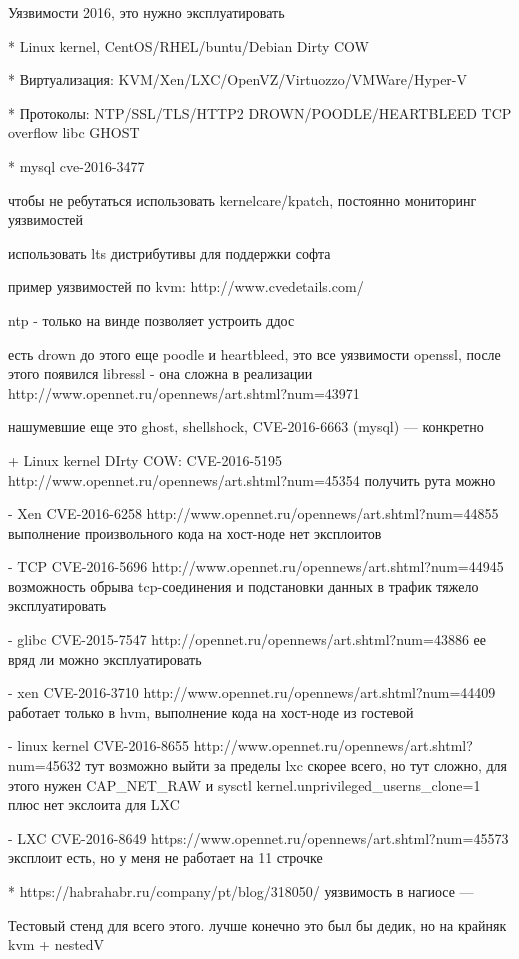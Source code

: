 Уязвимости 2016, это нужно эксплуатировать

* Linux kernel, CentOS/RHEL/buntu/Debian Dirty COW

* Виртуализация: KVM/Xen/LXC/OpenVZ/Virtuozzo/VMWare/Hyper-V

* Протоколы: NTP/SSL/TLS/HTTP2 DROWN/POODLE/HEARTBLEED TCP overflow libc GHOST

* mysql cve-2016-3477

чтобы не ребутаться использовать kernelcare/kpatch, постоянно мониторинг уязвимостей

использовать lts дистрибутивы для поддержки софта

пример уязвимостей по kvm: http://www.cvedetails.com/

ntp - только на винде позволяет устроить ддос

есть drown до этого еще poodle и heartbleed, это все уязвимости openssl, после этого появился libressl - она сложна в реализации http://www.opennet.ru/opennews/art.shtml?num=43971

нашумевшие еще это ghost, shellshock, CVE-2016-6663 (mysql)
--- конкретно

+ Linux kernel DIrty COW: CVE-2016-5195 http://www.opennet.ru/opennews/art.shtml?num=45354
получить рута можно

- Xen CVE-2016-6258 http://www.opennet.ru/opennews/art.shtml?num=44855
выполнение произвольного кода на хост-ноде
нет эксплоитов

- TCP CVE-2016-5696 http://www.opennet.ru/opennews/art.shtml?num=44945
возможность обрыва tcp-соединения и подстановки данных в трафик
тяжело эксплуатировать

- glibc CVE-2015-7547 http://opennet.ru/opennews/art.shtml?num=43886
ее вряд ли можно эксплуатировать

- xen CVE-2016-3710 http://www.opennet.ru/opennews/art.shtml?num=44409
работает только в hvm, выполнение кода на хост-ноде из гостевой

- linux kernel CVE-2016-8655 http://www.opennet.ru/opennews/art.shtml?num=45632
тут возможно выйти за пределы lxc скорее всего, но тут сложно, для этого нужен CAP\_NET\_RAW и sysctl kernel.unprivileged\_userns\_clone=1 плюс нет экслоита для LXC

- LXC CVE-2016-8649 https://www.opennet.ru/opennews/art.shtml?num=45573
эксплоит есть, но у меня не работает на 11 строчке

* https://habrahabr.ru/company/pt/blog/318050/ уязвимость в нагиосе
---

Тестовый стенд для всего этого.
лучше конечно это был бы дедик, но на крайняк kvm + nestedV

